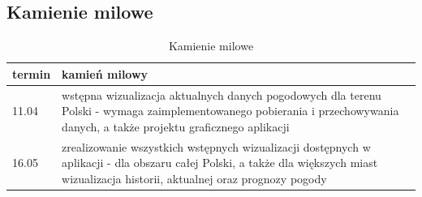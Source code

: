 \documentclass[10pt, a4paper]{article}
\begin{document}
\subsection{Kamienie milowe}
   \begin{table}[!h]
	\label{table_exres}
	\begin{tabular}{p{15mm}|p{120mm}}
		
		termin & kamień milowy\\ \hline
		11.04 & wstępna wizualizacja aktualnych danych pogodowych dla terenu Polski - wymaga zaimplementowanego pobierania i przechowywania danych, a także projektu graficznego aplikacji\\

		16.05 & zrealizowanie wszystkich wstępnych wizualizacji dostępnych w aplikacji - dla obszaru całej Polski, a także dla większych miast wizualizacja historii, aktualnej oraz prognozy pogody\\
	\end{tabular}
	\caption{Kamienie milowe}
\end{table}
\end{document}
